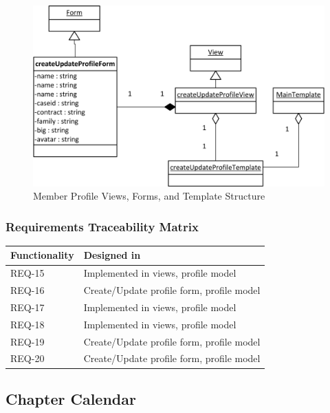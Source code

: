 \documentclass{article}
\begin{document}
\FloatBarrier
\begin{figure}[h!]
\centering
\includegraphics[scale=.65]{img/viewFormTemplateDiagrams/createUpdateProfile}
\caption{Member Profile Views, Forms, and Template Structure}
\label{fig:memberProfileViewFormTemplateDiagram}
\end{figure}
\FloatBarrier

\subsubsection{Requirements Traceability Matrix}

\FloatBarrier
\begin{table}
    \begin{tabular}{|l|l|}
        \hline
        Functionality & Designed in                               \\ \hline
        REQ-15        & Implemented in views, profile model       \\ 
        REQ-16        & Create/Update profile form, profile model \\ 
        REQ-17        & Implemented in views, profile model       \\ 
        REQ-18        & Implemented in views, profile model       \\ 
        REQ-19        & Create/Update profile form, profile model \\ 
        REQ-20        & Create/Update profile form, profile model \\
        \hline
    \end{tabular}
\end{table}
\FloatBarrier

\subsection{Chapter Calendar}
\end{document}
